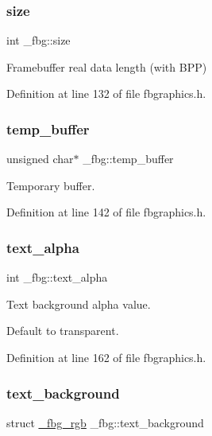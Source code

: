 \subsubsection{\texorpdfstring{size}{size}}
{\footnotesize\ttfamily int \+\_\+fbg\+::size}



Framebuffer real data length (with B\+PP) 



Definition at line 132 of file fbgraphics.\+h.

\mbox{\label{struct__fbg_a0463af9bf583afe770b822c1fbb9a24d}} 
\subsubsection{\texorpdfstring{temp\+\_\+buffer}{temp\_buffer}}
{\footnotesize\ttfamily unsigned char$\ast$ \+\_\+fbg\+::temp\+\_\+buffer}



Temporary buffer. 



Definition at line 142 of file fbgraphics.\+h.

\mbox{\label{struct__fbg_a870987786121c51135f20b630d731abd}} 
\subsubsection{\texorpdfstring{text\+\_\+alpha}{text\_alpha}}
{\footnotesize\ttfamily int \+\_\+fbg\+::text\+\_\+alpha}



Text background alpha value. 

Default to transparent. 

Definition at line 162 of file fbgraphics.\+h.

\mbox{\label{struct__fbg_afd34a8de5a853e915bd101f11d44cf67}} 
\subsubsection{\texorpdfstring{text\+\_\+background}{text\_background}}
{\footnotesize\ttfamily struct \mbox{\hyperlink{fbgraphics_8h_struct__fbg__rgb}{\+\_\+fbg\+\_\+rgb}} \+\_\+fbg\+::text\+\_\+background}



